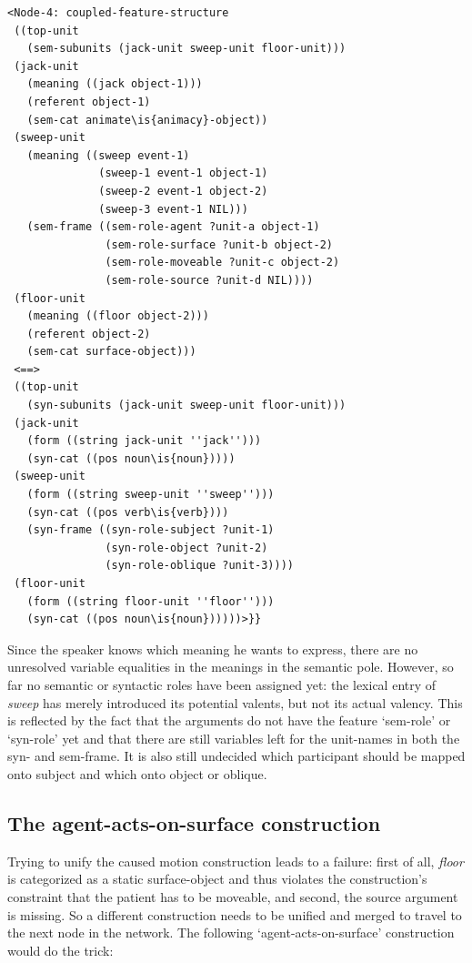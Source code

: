 \ea
\begin{lstlisting}
<Node-4: coupled-feature-structure
 ((top-unit
   (sem-subunits (jack-unit sweep-unit floor-unit)))
 (jack-unit
   (meaning ((jack object-1)))
   (referent object-1)
   (sem-cat animate\is{animacy}-object))
 (sweep-unit
   (meaning ((sweep event-1)
              (sweep-1 event-1 object-1)
              (sweep-2 event-1 object-2)
              (sweep-3 event-1 NIL)))
   (sem-frame ((sem-role-agent ?unit-a object-1)
               (sem-role-surface ?unit-b object-2)
               (sem-role-moveable ?unit-c object-2)
               (sem-role-source ?unit-d NIL))))
 (floor-unit
   (meaning ((floor object-2)))
   (referent object-2)
   (sem-cat surface-object)))
 <==>
 ((top-unit
   (syn-subunits (jack-unit sweep-unit floor-unit)))
 (jack-unit
   (form ((string jack-unit ''jack'')))
   (syn-cat ((pos noun\is{noun}))))
 (sweep-unit
   (form ((string sweep-unit ''sweep'')))
   (syn-cat ((pos verb\is{verb})))
   (syn-frame ((syn-role-subject ?unit-1)
               (syn-role-object ?unit-2)
               (syn-role-oblique ?unit-3))))
 (floor-unit
   (form ((string floor-unit ''floor'')))
   (syn-cat ((pos noun\is{noun})))))>}}

\end{lstlisting}
\z

Since the speaker knows which meaning he wants to express, there are no unresolved variable equalities in the meanings in the semantic pole. However, so far no semantic or syntactic roles have been assigned yet: the lexical entry of {\em sweep} has merely introduced its potential valents, but not its actual valency. This is reflected by the fact that the arguments do not have the feature `sem-role' or `syn-role' yet and that there are still variables left for the unit-names in both the syn- and sem-frame. It is also still undecided which participant should be mapped onto subject and which onto object or oblique.

\subsection{The agent-acts-on-surface construction}

Trying to unify the caused motion construction leads to a failure: first of all, {\em floor} is categorized as a static surface-object and thus violates the construction's constraint that the patient has to be moveable, and second, the source argument is missing. So a different construction needs to be unified and merged to travel to the next node in the network. The following `agent-acts-on-surface' construction would do the trick:

